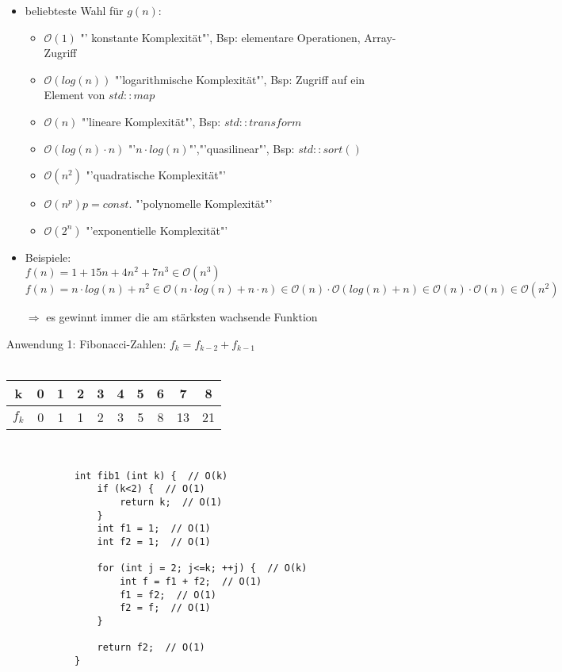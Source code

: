 \documentclass{article}
\begin{document}
\begin{itemize}
\begin{enumerate}
		\end{enumerate}
		\begin{itemize}
			\item beliebteste Wahl für $g(n)$:
			\begin{itemize}
				\item $\mathcal{O}(1)$ "' konstante Komplexität"', Bsp: elementare Operationen, Array-Zugriff
				\item $\mathcal{O}(log(n))$ "'logarithmische Komplexität"', Bsp: Zugriff auf ein Element von $std::map$
				\item $\mathcal{O}(n)$ "'lineare Komplexität"', Bsp: $std::transform$
				\item $\mathcal{O}(log(n) \cdot n)$ "'$n \cdot log(n)$"',"'quasilinear"', Bsp: $std::sort()$
				\item $\mathcal{O}(n^2)$ "'quadratische Komplexität"'
				\item $\mathcal{O}(n^p) p=const.$ "'polynomelle Komplexität"'
				\item $\mathcal{O}(2^n)$ "'exponentielle Komplexität"'
			\end{itemize}
			\item Beispiele:  \\
			$f(n)=1+15n+4n^2+7n^3 \in \mathcal{O}(n^3)$ \\
			$f(n)=n \cdot log(n) + n^2 \in \mathcal{O}(n \cdot log(n) + n\cdot n) \in \mathcal{O}(n) \cdot \mathcal{O}(log(n) + n) \in \mathcal{O}(n) \cdot \mathcal{O}(n) \in \mathcal{O}(n^2)$
			
			$\Rightarrow$ es gewinnt immer die am stärksten wachsende Funktion
		\end{itemize}
		Anwendung 1: Fibonacci-Zahlen: $f_k = f_{k-2} + f_{k-1}$  \\ \\
		\begin{tabular} {c|c|c|c|c|c|c|c|c|c}
			k & 0 & 1 & 2 & 3 & 4 & 5 & 6 & 7 & 8 \\
			\hline
			$f_k$ & 0 & 1 & 1 & 2 & 3 & 5 & 8 & 13 & 21 
		\end{tabular} \\
		\begin{lstlisting}
			int fib1 (int k) {  // O(k)
				if (k<2) {  // O(1)
					return k;  // O(1)
				}
				int f1 = 1;  // O(1)
				int f2 = 1;  // O(1)
			
				for (int j = 2; j<=k; ++j) {  // O(k)
					int f = f1 + f2;  // O(1)
					f1 = f2;  // O(1)
					f2 = f;  // O(1)
				}
				
				return f2;  // O(1)
			}
			

\end{lstlisting}
\end{itemize}
\end{document}
